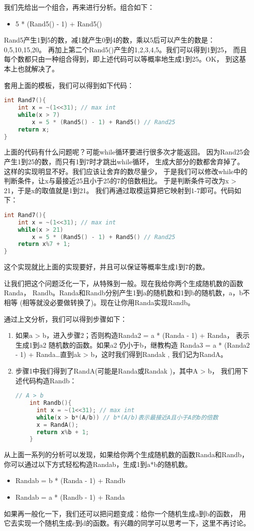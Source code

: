\begin{description}
我们先给出一个组合，再来进行分析。组合如下：
\begin{itemize}
\item 5 * (Rand5() - 1) + Rand5()
\end{itemize}
Rand5产生1到5的数，减1就产生0到4的数，乘以5后可以产生的数是：0,5,10,15,20。 再加上第二个Rand5()产生的1,2,3,4,5。我们可以得到1到25， 而且每个数都只由一种组合得到，即上述代码可以等概率地生成1到25。OK， 到这基本上也就解决了。

套用上面的模板，我们可以得到如下代码：
\begin{lstlisting}[language=C++]
int Rand7(){
    int x = ~(1<<31); // max int
    while(x > 7)
        x = 5 * (Rand5() - 1) + Rand5() // Rand25
    return x;
}
\end{lstlisting}
上面的代码有什么问题呢？可能while循环要进行很多次才能返回。 因为Rand25会产生1到25的数，而只有1到7时才跳出while循环， 生成大部分的数都舍弃掉了。这样的实现明显不好。我们应该让舍弃的数尽量少， 于是我们可以修改while中的判断条件，让x与最接近25且小于25的7的倍数相比。 于是判断条件可改为x > 21，于是x的取值就是1到21。 我们再通过取模运算把它映射到1-7即可。代码如下：
\begin{lstlisting}[language=C++]
int Rand7(){
    int x = ~(1<<31); // max int
    while(x > 21)
        x = 5 * (Rand5() - 1) + Rand5() // Rand25
    return x%7 + 1;
}
\end{lstlisting}
这个实现就比上面的实现要好，并且可以保证等概率生成1到7的数。

让我们把这个问题泛化一下，从特殊到一般。现在我给你两个生成随机数的函数Randa， Randb。Randa和Randb分别产生1到a的随机数和1到b的随机数，a，b不相等 (相等就没必要做转换了)。现在让你用Randa实现Randb。

通过上文分析，我们可以得到步骤如下：
\begin{enumerate}
\item 如果a > b，进入步骤2；否则构造Randa2 = a * (Randa - 1) + Randa， 表示生成1到a2 随机数的函数。如果a2 仍小于b，继教构造 Randa3 = a * (Randa2 - 1) + Randa…直到ak > b，这时我们得到Randak , 我们记为RandA。
\item 步骤1中我们得到了RandA(可能是Randa或Randak )，其中A > b， 我们用下述代码构造Randb：
  \begin{lstlisting}[language=C++]
    // A > b
    int Randb(){
      int x = ~(1<<31); // max int
      while(x > b*(A/b)) // b*(A/b)表示最接近A且小于A的b的倍数
      x = RandA();
      return x%b + 1;
    }
  \end{lstlisting}
\end{enumerate}
从上面一系列的分析可以发现，如果给你两个生成随机数的函数Randa和Randb， 你可以通过以下方式轻松构造Randab，生成1到a*b的随机数。
\begin{itemize}
\item Randab = b * (Randa - 1) + Randb
\item Randab = a * (Randb - 1) + Randa
\end{itemize}
如果再一般化一下，我们还可以把问题变成：给你一个随机生成a到b的函数， 用它去实现一个随机生成c到d的函数。有兴趣的同学可以思考一下，这里不再讨论。
%



\end{description}
